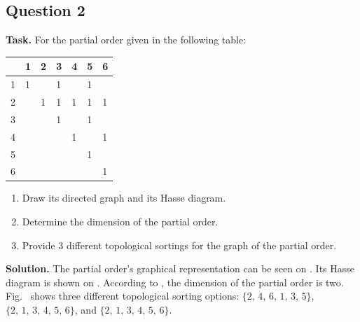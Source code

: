 \documentclass[14pt,a4paper]{extarticle}
\begin{document}
	 \subsection*{Question 2}
	 
	 \noindent\textbf{Task.} For the partial order given in the following table:
	 
	 \begin{center}
	 	\begin{tabu}{ |X[c]|X[c]|X[c]|X[c]|X[c]|X[c]|X[c]|}
	 		\hline
	 		& 1 & 2 & 3 & 4 & 5 & 6\\
	 		 & 1 &  & 1 &  & 1 & \\
	 		 &  & 1 & 1 & 1 & 1 & 1\\
	 		 &  &  & 1 &  & 1 & \\
	 		 &  &  &  & 1 &  & 1\\
	 		 &  &  &  &  & 1 & \\
	 		 &  &  &  &  &  & 1\\
	 		\hline
	 	\end{tabu}
	 \end{center}
	 \begin{enumerate}
	 	\item Draw its directed graph and its Hasse diagram. 
	 	\item Determine the dimension of the partial order. 
	 	\item Provide 3 different topological sortings for the graph of the partial order.
	 \end{enumerate}
	 \textbf{Solution.} The partial order's graphical representation can be seen on . Its Hasse diagram is shown on . According to , the dimension of the partial order is two. Fig.~ shows three different topological sorting options: $\{2,\, 4,\, 6,\, 1,\, 3,\, 5\}$, $\{2,\, 1,\, 3,\, 4,\, 5,\, 6\}$, and $\{2,\, 1,\, 3,\, 4,\, 5,\, 6\}$.
	 
\end{document}

